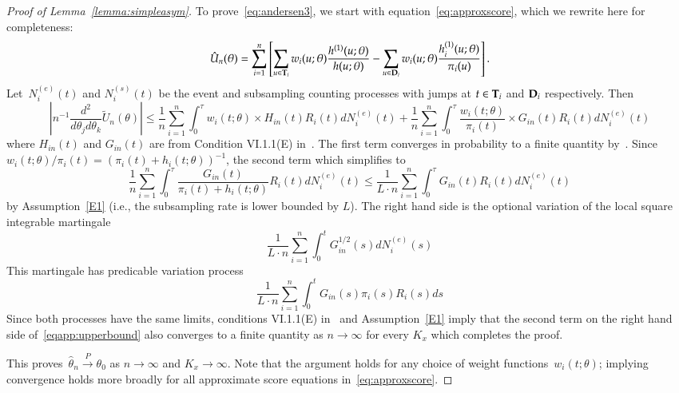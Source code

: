 \documentclass[12pt]{amsart}
\def\bfT{{\bf T}}
\def\bfD{{\bf D}}
\begin{document}
\begin{proof}[Proof of Lemma~\ref{lemma:simpleasym}]
To prove~\eqref{eq:andersen3}, we start with equation~\eqref{eq:approxscore}, which we rewrite here for completeness:
\[
\hat{U}_n (\theta) = \sum_{i=1}^n \left[ \sum_{u \in \bfT_i} w_i(u; \theta)
  \frac{h^{(1)} (u; \theta)}{ h ( u; \theta)}  - \sum_{u \in \bfD_i} w_i(u;
  \theta) \frac{h_i^{(1)} (u; \theta)}{ \pi_i (u) } \right].
\]
Let~$N_i^{(e)} (t)$ and $N_i^{(s)} (t)$ be the event and subsampling counting processes with jumps at $t \in \bfT_i$ and $\bfD_i$ respectively.  Then
\begin{equation}
\label{eqapp:upperbound}
\left | n^{-1} \frac{d^2}{d \theta_j d \theta_k} \tilde U_n (\theta)  \right | \leq \frac{1}{n} \sum_{i=1}^n \int_0^\tau w_i (t;\theta) \times H_{in} (t) R_i (t) dN_i^{(e)} (t) +
\frac{1}{n} \sum_{i=1}^n \int_0^\tau \frac{w_i (t;\theta)}{\pi_i (t)} \times G_{in} (t) R_i (t) dN_i^{(e)} (t)
\end{equation}
where $H_{in}(t)$ and $G_{in}(t)$ are from Condition VI.1.1(E) in~\cite[pp. 421]{Andersen1993}. The first term converges in probability to a finite quantity by~\cite{Andersen1993}.  Since~$w_i(t;\theta)/\pi_i (t) = (\pi_i(t)+h_i(t;\theta))^{-1}$, the second term which simplifies to
\[
\frac{1}{n} \sum_{i=1}^n \int_0^\tau \frac{G_{in} (t)}{\pi_i (t)+h_i(t;\theta)} R_i(t) dN_i^{(e)} (t)
\leq
\frac{1}{L \cdot n} \sum_{i=1}^n \int_0^\tau G_{in} (t) R_i (t) dN_i^{(e)} (t)
\]
by Assumption~\ref{E1} (i.e., the subsampling rate is lower bounded by $L$). The right hand side is the optional variation of the local square integrable martingale
$$
\frac{1}{L \cdot n} \sum_{i=1}^n \int_0^t G^{1/2}_{in} (s) dN_i^{(e)} (s)
$$
This martingale has predicable variation process
$$
\frac{1}{L \cdot n} \sum_{i=1}^n \int_0^t G_{in} (s) \pi_i (s) R_i (s) ds
$$
Since both processes have the same limits, conditions VI.1.1(E) in~\cite{Andersen1993} and Assumption~\ref{E1} imply that the second term on the right hand side of~\eqref{eqapp:upperbound} also converges to a finite quantity as $n \to \infty$ for every $K_x$ which completes the proof.

This proves~$\hat \theta_n \overset{P}{\to} \theta_0$ as $n \to \infty$ and $K_x \to \infty$. Note that the argument holds for any choice of weight functions~$w_i (t;\theta)$; implying convergence holds more broadly for all approximate score equations in~\eqref{eq:approxscore}.
\end{proof}
\end{document}
